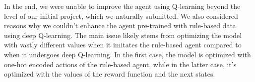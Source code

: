 In the end, we were unable to improve the agent using Q-learning beyond the level of our initial project, 
which we naturally submitted. We also considered reasons why we couldn't enhance the agent pre-trained with rule-based 
data using deep Q-learning. The main issue likely stems from optimizing the model with vastly different values when it imitates 
the rule-based agent compared to when it undergoes deep Q-learning. In the first case, the model is optimized with one-hot encoded 
actions of the rule-based agent, while in the latter case, it's optimized with the values of the reward function and the next states.